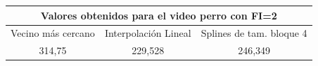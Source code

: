 \begin{figure}[ht]
	\begin{center}
	\end{center}
\end{figure}

\begin{center}
\begin{tabular}{| c | c | c |}
\hline
\multicolumn{3}{|c|}{Valores obtenidos para el video \textbf{perro} con FI=2}  \\
\hline
Vecino más cercano & Interpolación Lineal & Splines de tam. bloque 4  \\ 
\hline
314,75	& 229,528	&	246,349	\\
\hline
\end{tabular}
\end{center}

